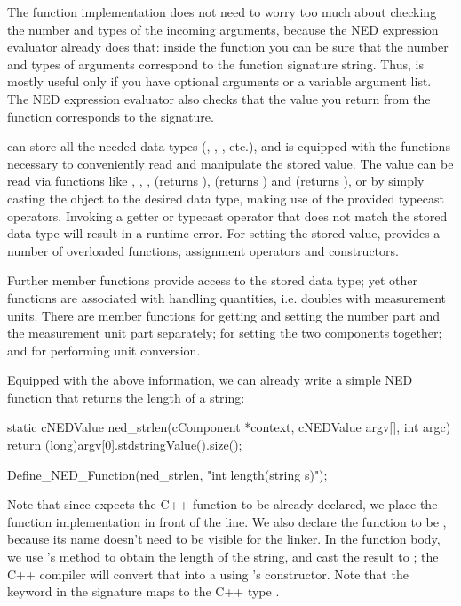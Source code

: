 The function implementation does not need to worry too much about checking
the number and types of the incoming arguments, because the NED expression
evaluator already does that: inside the function you can be sure that the
number and types of arguments correspond to the function signature string.
Thus,  is mostly useful only if you have optional arguments or a
variable argument list. The NED expression evaluator also checks that the
value you return from the function corresponds to the signature.

 can store all the needed data types (,
, , etc.), and is equipped with the functions
necessary to conveniently read and manipulate the stored value. The value can
be read via functions like , ,
,  (returns ),
 (returns ) and
 (returns ), or by simply casting the
object to the desired data type, making use of the provided typecast
operators. Invoking a getter or typecast operator that does not match the
stored data type will result in a runtime error. For setting the stored
value,  provides a number of overloaded 
functions, assignment operators and constructors.

Further  member functions provide access to the stored
data type; yet other functions are associated with handling quantities,
i.e. doubles with measurement units. There are member functions for getting
and setting the number part and the measurement unit part separately; for
setting the two components together; and for performing unit conversion.

Equipped with the above information, we can already write a simple NED function
that returns the length of a string:

\begin{cpp}
static cNEDValue ned_strlen(cComponent *context, cNEDValue argv[], int argc)
{
    return (long)argv[0].stdstringValue().size();
}

Define_NED_Function(ned_strlen, "int length(string s)");
\end{cpp}

Note that since  expects the C++ function to
be already declared, we place the function implementation in front of the
 line. We also declare the function to be
, because its name doesn't need to be visible for the linker.
In the function body, we use 's  method to
obtain the length of the string, and cast the result to ; the C++
compiler will convert that into a  using 's
 constructor. Note that the  keyword in the signature
maps to the C++ type .

